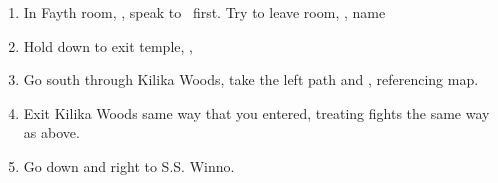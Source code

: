 \begin{enumerate}[resume]
	\item In Fayth room, \sd, speak to \wakka\ first. Try to leave room, \sd, name \ifrit
	\item Hold down to exit temple, \cs[0:40], \sd
	\item Go south through Kilika Woods, take the left path and , referencing map.
	\item Exit Kilika Woods same way that you entered, treating fights the same way as above.
	\item Go down and right to S.S. Winno. \sd
\end{enumerate}